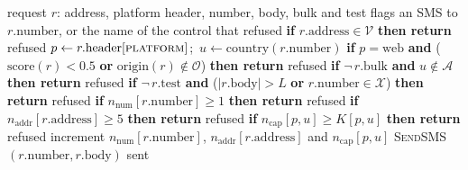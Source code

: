 \begin{algorithmic}[1]
\REQUIRE request $r$: address, platform header, number, body, bulk and test flags
\ENSURE an SMS to $r.\mathrm{number}$, or the name of the control that refused
\STATE \textbf{if} $r.\mathrm{address} \in \mathcal{V}$ \textbf{then return} refused
\STATE $p \gets r.\mathrm{header}[\textsc{platform}]$;\ $u \gets \mathrm{country}(r.\mathrm{number})$
\STATE \textbf{if} $p = \mathrm{web}$ \textbf{and} ($\mathrm{score}(r) < 0.5$ \textbf{or} $\mathrm{origin}(r) \notin \mathcal{O}$) \textbf{then return} refused
\STATE \textbf{if} $\neg\, r.\mathrm{bulk}$ \textbf{and} $u \notin \mathcal{A}$ \textbf{then return} refused
\STATE \textbf{if} $\neg\, r.\mathrm{test}$ \textbf{and} ($|r.\mathrm{body}| > L$ \textbf{or} $r.\mathrm{number} \in \mathcal{X}$) \textbf{then return} refused
\STATE \textbf{if} $n_{\mathrm{num}}[r.\mathrm{number}] \ge 1$ \textbf{then return} refused
\STATE \textbf{if} $n_{\mathrm{addr}}[r.\mathrm{address}] \ge 5$ \textbf{then return} refused
\STATE \textbf{if} $n_{\mathrm{cap}}[p, u] \ge K[p, u]$ \textbf{then return} refused
\STATE increment $n_{\mathrm{num}}[r.\mathrm{number}]$, $n_{\mathrm{addr}}[r.\mathrm{address}]$ and $n_{\mathrm{cap}}[p, u]$
\STATE \textsc{SendSMS}$(r.\mathrm{number}, r.\mathrm{body})$
\RETURN sent
\end{algorithmic}
